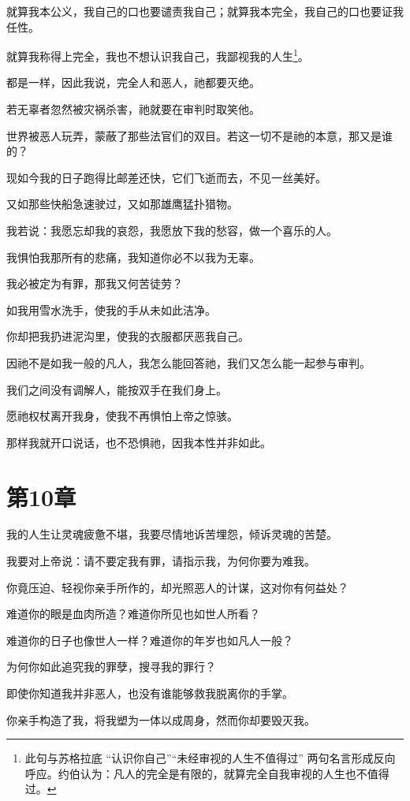 \documentclass[12pt,oneside]{book}
\begin{document}
就算我本公义，我自己的口也要谴责我自己；就算我本完全，我自己的口也要证我任性。

就算我称得上完全，我也不想认识我自己，我鄙视我的人生\footnote{此句与苏格拉底 “认识你自己”“未经审视的人生不值得过” 两句名言形成反向呼应。约伯认为：凡人的完全是有限的，就算完全自我审视的人生也不值得过。}。

都是一样，因此我说，完全人和恶人，祂都要灭绝。

若无辜者忽然被灾祸杀害，祂就要在审判时取笑他。

世界被恶人玩弄，蒙蔽了那些法官们的双目。若这一切不是祂的本意，那又是谁的？

现如今我的日子跑得比邮差还快，它们飞逝而去，不见一丝美好。

又如那些快船急速驶过，又如那雄鹰猛扑猎物。

我若说：我愿忘却我的哀怨，我愿放下我的愁容，做一个喜乐的人。

我惧怕我那所有的悲痛，我知道你必不以我为无辜。

我必被定为有罪，那我又何苦徒劳？

如我用雪水洗手，使我的手从未如此洁净。

你却把我扔进泥沟里，使我的衣服都厌恶我自己。

因祂不是如我一般的凡人，我怎么能回答祂，我们又怎么能一起参与审判。

我们之间没有调解人，能按双手在我们身上。

愿祂权杖离开我身，使我不再惧怕上帝之惊骇。

那样我就开口说话，也不恐惧祂，因我本性并非如此。



\chapter{第10章}
我的人生让灵魂疲惫不堪，我要尽情地诉苦埋怨，倾诉灵魂的苦楚。

我要对上帝说：请不要定我有罪，请指示我，为何你要为难我。

你竟压迫、轻视你亲手所作的，却光照恶人的计谋，这对你有何益处？

难道你的眼是血肉所造？难道你所见也如世人所看？

难道你的日子也像世人一样？难道你的年岁也如凡人一般？

为何你如此追究我的罪孽，搜寻我的罪行？

即使你知道我并非恶人，也没有谁能够救我脱离你的手掌。

你亲手构造了我，将我塑为一体以成周身，然而你却要毁灭我。
\end{document}
